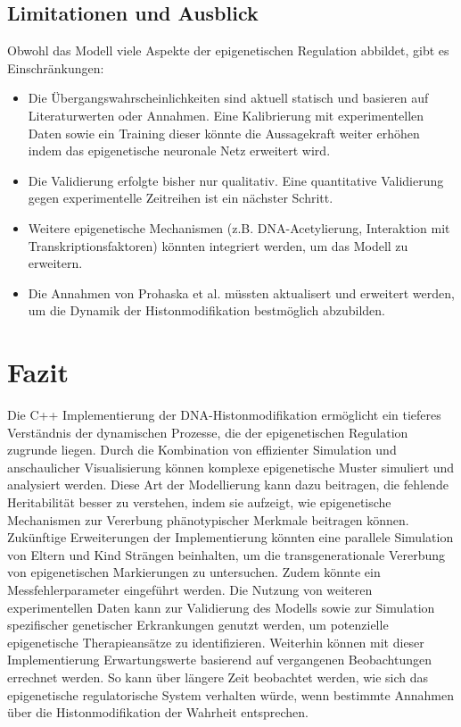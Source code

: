 \documentclass{SeminarV2}
\begin{document}
\subsection{Limitationen und Ausblick}
Obwohl das Modell viele Aspekte der epigenetischen Regulation abbildet, gibt es Einschr\"{a}nkungen:
\begin{itemize}
    \item Die \"{U}bergangswahrscheinlichkeiten sind aktuell statisch und basieren auf Literaturwerten oder Annahmen. Eine Kalibrierung mit experimentellen Daten sowie ein Training dieser k\"{o}nnte die Aussagekraft weiter erh\"{o}hen indem das epigenetische neuronale Netz erweitert wird.
    \item Die Validierung erfolgte bisher nur qualitativ. Eine quantitative Validierung gegen experimentelle Zeitreihen ist ein n\"{a}chster Schritt.
    \item Weitere epigenetische Mechanismen (z.B. DNA-Acetylierung, Interaktion mit Transkriptionsfaktoren) k\"{o}nnten integriert werden, um das Modell zu erweitern.
    \item Die Annahmen von Prohaska et al. müssten aktualisert und erweitert werden, um die Dynamik der Histonmodifikation bestmöglich abzubilden.
\end{itemize}

\section{Fazit}
Die C++ Implementierung der DNA-Histonmodifikation erm\"{o}glicht ein tieferes Verst\"{a}ndnis der dynamischen Prozesse, die der epigenetischen Regulation zugrunde liegen. Durch die Kombination von effizienter Simulation und anschaulicher Visualisierung k\"{o}nnen komplexe epigenetische Muster simuliert und analysiert werden.
Diese Art der Modellierung kann dazu beitragen, die fehlende Heritabilit\"{a}t besser zu verstehen, indem sie aufzeigt, wie epigenetische Mechanismen zur Vererbung ph\"{a}notypischer Merkmale beitragen k\"{o}nnen. 
Zuk\"{u}nftige Erweiterungen der Implementierung k\"{o}nnten eine parallele Simulation von Eltern und Kind Str\"{a}ngen beinhalten, um die transgenerationale Vererbung von epigenetischen Markierungen zu untersuchen.
Zudem könnte ein Messfehlerparameter eingeführt werden.
Die Nutzung von weiteren experimentellen Daten kann zur Validierung des Modells sowie zur Simulation spezifischer genetischer Erkrankungen genutzt werden, um potenzielle epigenetische Therapieans\"{a}tze zu identifizieren.
Weiterhin können mit dieser Implementierung Erwartungswerte basierend auf vergangenen Beobachtungen errechnet werden. So kann \"{u}ber l\"{a}ngere Zeit beobachtet werden, wie sich das epigenetische regulatorische System verhalten w\"{u}rde, wenn bestimmte Annahmen \"{u}ber die Histonmodifikation der Wahrheit entsprechen.
\end{document}
